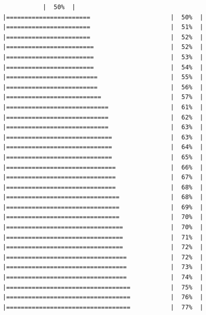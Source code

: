 \documentclass[
  krantz2]{krantz}
\begin{document}
\begin{verbatim}
           |  50%  |                                                     |=======================                      |  50%  |                                                     |=======================                      |  51%  |                                                     |=======================                      |  52%  |                                                     |========================                     |  52%  |                                                     |========================                     |  53%  |                                                     |========================                     |  54%  |                                                     |=========================                    |  55%  |                                                     |=========================                    |  56%  |                                                     |==========================                   |  57%  |                                                     |============================                 |  61%  |                                                     |============================                 |  62%  |                                                     |============================                 |  63%  |                                                     |=============================                |  63%  |                                                     |=============================                |  64%  |                                                     |=============================                |  65%  |                                                     |==============================               |  66%  |                                                     |==============================               |  67%  |                                                     |==============================               |  68%  |                                                     |===============================              |  68%  |                                                     |===============================              |  69%  |                                                     |===============================              |  70%  |                                                     |================================             |  70%  |                                                     |================================             |  71%  |                                                     |================================             |  72%  |                                                     |=================================            |  72%  |                                                     |=================================            |  73%  |                                                     |=================================            |  74%  |                                                     |==================================           |  75%  |                                                     |==================================           |  76%  |                                                     |==================================           |  77%  |                                                     
\end{verbatim}
\end{document}
